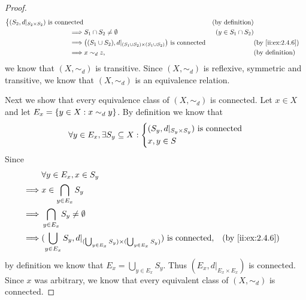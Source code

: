 \begin{proof}
\begin{align*}
\begin{dcases}
                                                (S_2, d|_{S_2 \times S_2}) \text{ is connected}
                                              \end{dcases}                                       &                      & \text{(by definition)}        \\
    \implies & S_1 \cap S_2 \neq \emptyset                                                              & (y \in S_1 \cap S_2)                          \\
    \implies & \big((S_1 \cup S_2), d|_{(S_1 \cup S_2) \times (S_1 \cup S_2)}\big) \text{ is connected} &                      & \by{ii:ex:2.4.6}       \\
    \implies & x \sim_d z,                                                                              &                      & \text{(by definition)}
  \end{align*}
  we know that \((X, \sim_d)\) is transitive.
  Since \((X, \sim_d)\) is reflexive, symmetric and transitive, we know that \((X, \sim_d)\) is an equivalence relation.

  Next we show that every equivalence class of \((X, \sim_d)\) is connected.
  Let \(x \in X\) and let \(E_x = \left\lbrace y \in X : x \sim_d y\right\rbrace\).
  By definition we know that
  \[
    \forall y \in E_x, \exists S_y \subseteq X : \begin{dcases}
      (S_y, d|_{S_y \times S_y}) \text{ is connected} \\
      x, y \in S
    \end{dcases}
  \]
  Since
  \begin{align*}
             & \forall y \in E_x, x \in S_y                                                                                                           \\
    \implies & x \in \bigcap_{y \in E_x} S_y                                                                                                          \\
    \implies & \bigcap_{y \in E_x} S_y \neq \emptyset                                                                                                 \\
    \implies & (\bigcup_{y \in E_x} S_y, d|_{(\bigcup_{y \in E_x} S_y) \times (\bigcup_{y \in E_x} S_y)}) \text{ is connected}, &  & \by{ii:ex:2.4.6}
  \end{align*}
  by definition we know that \(E_x = \bigcup_{y \in E_x} S_y\).
  Thus \((E_x, d|_{E_x \times E_x})\) is connected.
  Since \(x\) was arbitrary, we know that every equivalent class of \((X, \sim_d)\) is connected.


\end{proof}
